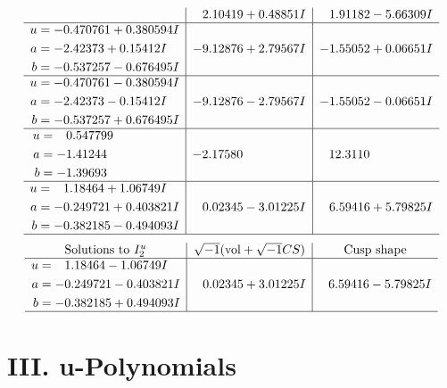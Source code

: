 \documentclass[1p]{elsarticle_modified}
\theoremstyle{definition}
\newcommand{\I}{\sqrt{-1}}
\begin{document}
$$\begin{array}{c|c|c}
 & \phantom{-}2.10419 + 0.48851 I & \phantom{-}1.91182 - 5.66309 I \\ \hline\begin{aligned}
u &= -0.470761 + 0.380594 I \\
a &= -2.42373 + 0.15412 I \\
b &= -0.537257 - 0.676495 I\end{aligned}
 & -9.12876 + 2.79567 I & -1.55052 + 0.06651 I \\ \hline\begin{aligned}
u &= -0.470761 - 0.380594 I \\
a &= -2.42373 - 0.15412 I \\
b &= -0.537257 + 0.676495 I\end{aligned}
 & -9.12876 - 2.79567 I & -1.55052 - 0.06651 I \\ \hline\begin{aligned}
u &= \phantom{-}0.547799\phantom{ +0.000000I} \\
a &= -1.41244\phantom{ +0.000000I} \\
b &= -1.39693\phantom{ +0.000000I}\end{aligned}
 & -2.17580\phantom{ +0.000000I} & \phantom{-}12.3110\phantom{ +0.000000I} \\ \hline\begin{aligned}
u &= \phantom{-}1.18464 + 1.06749 I \\
a &= -0.249721 + 0.403821 I \\
b &= -0.382185 - 0.494093 I\end{aligned}
 & \phantom{-}0.02345 - 3.01225 I & \phantom{-}6.59416 + 5.79825 I\\
 \hline 
 \end{array}$$\newpage$$\begin{array}{c|c|c}  
\text{Solutions to }I^u_{2}& \I (\text{vol} + \sqrt{-1}CS) & \text{Cusp shape}\\
 \hline 
\begin{aligned}
u &= \phantom{-}1.18464 - 1.06749 I \\
a &= -0.249721 - 0.403821 I \\
b &= -0.382185 + 0.494093 I\end{aligned}
 & \phantom{-}0.02345 + 3.01225 I & \phantom{-}6.59416 - 5.79825 I\\
 \hline 
 \end{array}$$\newpage
\newpage\renewcommand{\arraystretch}{1}
\centering \section*{ III. u-Polynomials}
\end{document}

